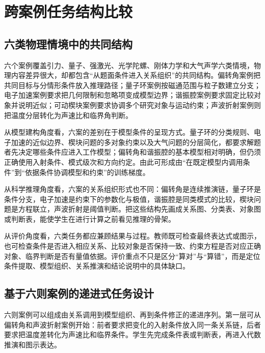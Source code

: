 \documentclass[
  12pt,
  a4paper]{ctexbook}
\begin{document}
\section{跨案例任务结构比较}\label{ux8de8ux6848ux4f8bux4efbux52a1ux7ed3ux6784ux6bd4ux8f83}

\subsection{六类物理情境中的共同结构}\label{ux516dux7c7bux7269ux7406ux60c5ux5883ux4e2dux7684ux5171ux540cux7ed3ux6784}

六个案例覆盖引力、量子、强激光、光学陀螺、刚体力学和大气声学六类情境，物理内容差异很大，却都包含``从题面条件进入关系组织''的共同结构。偏转角案例把共同目标与分情形条件放入推理路径；量子环案例按磁通范围与粒子数建立分支；电子加速案例要求把几何限制和忽略项变成模型边界；谐振腔案例要求固定比较对象并说明近似；可动楔块案例要求协调多个研究对象与运动约束；声波折射案例则把温度分层转化为声速比和临界角判断。

从模型建构角度看，六案的差别在于模型条件的呈现方式。量子环的分类规则、电子加速的近似边界、楔块问题的多对象约束以及大气问题的分层简化，都要求解题者先决定哪些条件应进入工作模型；偏转角和谐振腔的基本模型相对明确，但仍须正确使用入射条件、模式级次和方向约定。由此可形成由``在既定模型内调用条件''到``依据条件协调模型和约束''的训练梯度。

从科学推理角度看，六案的关系组织形式也不同：偏转角是连续推演链，量子环是条件分支，电子加速是约束下的参数化与极值，谐振腔是同类模式的比较，楔块问题是方程联立，声波折射是阈值判断。把这些结构先画成关系图、分类表、对象图或判断表，能使学生在进行计算之前看见推理的骨架。

从评价角度看，六类任务都应兼顾结果与过程。教师既可检查最终表达式或图示，也可检查条件是否进入相应关系、比较对象是否保持一致、约束方程是否对应正确对象、临界判断是否有量值依据。评价重点不只是区分``算对''与``算错''，而是定位条件提取、模型组织、关系推演和结论说明中的具体缺口。

\subsection{基于六则案例的递进式任务设计}\label{ux57faux4e8eux516dux5219ux6848ux4f8bux7684ux9012ux8fdbux5f0fux4efbux52a1ux8bbeux8ba1}

六则案例可以组成由关系调用到模型组织、再到条件修正的递进序列。第一层可从偏转角和声波折射案例开始：前者要求把变化的入射条件放入同一条关系链，后者要求把温度差转化为声速比和临界条件。学生先完成条件表或判断表，再进入代数推演和图示表达。
\end{document}
